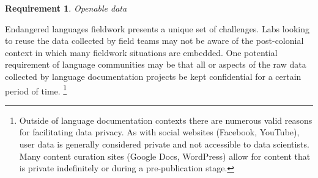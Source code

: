 \documentclass[11pt]{article}
\newtheorem{requirement}{Requirement}
\begin{document}

\begin{requirement}
	\label{req:openable}
       Openable data
\end{requirement}

Endangered languages fieldwork  presents a unique set of challenges. Labs
looking to reuse the data collected by field teams may not be aware of the
post-colonial context in which many fieldwork situations are embedded.  One
potential requirement of language communities may be that all or aspects of the
raw data collected by language documentation projects be kept confidential for a
certain period of time.%
\footnote{Outside of language documentation contexts there are numerous valid
    reasons for facilitating data privacy. As with social websites
    (Facebook, YouTube), user data is generally considered private and not
    accessible to data scientists. Many content curation sites (Google Docs,
WordPress) allow for content that is private indefinitely or during a
pre-publication stage.} %
\end{document}
